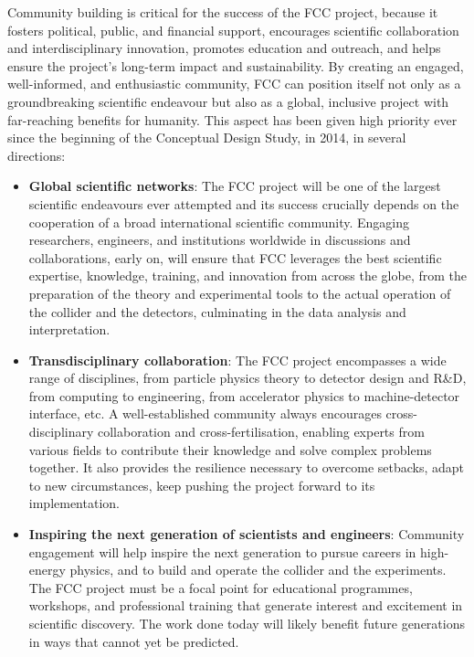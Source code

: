 Community building is critical for the success of the FCC project, because it fosters political, public, and financial support, encourages scientific collaboration and interdisciplinary innovation, promotes edu\-ca\-tion and outreach, and helps ensure the project’s long-term impact and sustainability. 
By creating an engaged, well-informed, and enthusiastic community, FCC can position itself not only as a groundbreaking scientific endeavour but also as a global, inclusive project with far-reaching benefits for humanity. 
This aspect has been given high priority ever since the beginning of the Conceptual Design Study, in 2014, in several directions:

\begin{itemize}
\item {\bf Global scientific networks}: 
The FCC project will be one of the largest scientific endeavours ever attempted and its success crucially depends on the cooperation of a broad international scientific community. 
Engaging researchers, engineers, and institutions worldwide in discussions and collaborations, early on, will ensure that 
FCC leverages the best scientific expertise, knowledge, training, and innovation from across the globe,
from the preparation of the theory and experimental tools to the actual operation of the collider and the detectors, culminating in the data analysis and interpretation.
\item {\bf Transdisciplinary collaboration}: 
The FCC project encompasses a wide range of disciplines, from particle physics theory to detector design and R\&D, from computing to engineering, from accelerator physics to machine-detector interface, etc. 
A well-established community always encourages cross-disciplinary collaboration and cross-fertilisation, enabling experts from various fields to contribute their knowledge and solve complex problems together. 
It also provides the resilience necessary to overcome setbacks, adapt to new circumstances, keep pushing the project forward to its implementation.
\item {\bf Inspiring the next generation of scientists and engineers}: 
Community engagement will help inspire the next generation to pursue careers in high-energy physics, and to build and operate the collider and the experiments. 
The FCC project must be a focal point for educational programmes, workshops, and professional training that generate interest and excitement in scientific discovery. The work done today will likely benefit future generations in ways that cannot yet be predicted. 

\end{itemize}
